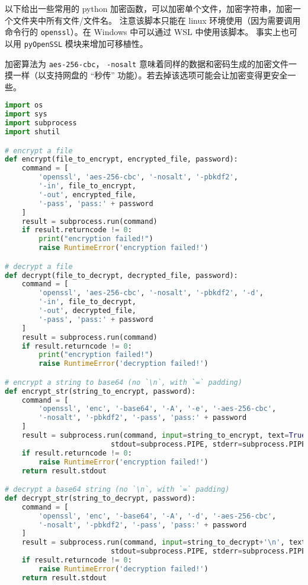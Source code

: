 

以下给出一些常用的 python 加密函数，可以加密单个文件，加密字符串，加密一个文件夹中所有文件/文件名。 注意该脚本只能在 linux 环境使用（因为需要调用命令行的 \verb`openssl`）。在 Windows 中可以通过 WSL 中使用该脚本。 事实上也可以用 \verb|pyOpenSSL| 模块来增加可移植性。

加密算法为 \verb`aes-256-cbc`， \verb`-nosalt` 意味着同样的数据和密码生成的加密文件一摸一样（以支持网盘的 “秒传” 功能）。若去掉该选项可能会让加密变得更安全一些。

\begin{lstlisting}[language=python,caption=encrypt.py]
import os
import sys
import subprocess
import shutil

# encrypt a file
def encrypt(file_to_encrypt, encrypted_file, password):
	command = [
		'openssl', 'aes-256-cbc', '-nosalt', '-pbkdf2',
		'-in', file_to_encrypt,
		'-out', encrypted_file,
		'-pass', 'pass:' + password
	]
	result = subprocess.run(command)
	if result.returncode != 0:
		print("encryption failed!")
		raise RuntimeError('encryption failed!')

# decrypt a file
def decrypt(file_to_decrypt, decrypted_file, password):
	command = [
		'openssl', 'aes-256-cbc', '-nosalt', '-pbkdf2', '-d',
		'-in', file_to_decrypt,
		'-out', decrypted_file,
		'-pass', 'pass:' + password
	]
	result = subprocess.run(command)
	if result.returncode != 0:
		print("encryption failed!")
		raise RuntimeError('decryption failed!')

# encrypt a string to base64 (no `\n`, with `=` padding)
def encrypt_str(string_to_encrypt, password):
	command = [
		'openssl', 'enc', '-base64', '-A', '-e', '-aes-256-cbc',
		'-nosalt', '-pbkdf2', '-pass', 'pass:' + password
	]
	result = subprocess.run(command, input=string_to_encrypt, text=True,
						 stdout=subprocess.PIPE, stderr=subprocess.PIPE)
	if result.returncode != 0:
		raise RuntimeError('encryption failed!')
	return result.stdout

# decrypt a base64 string (no `\n`, with `=` padding)
def decrypt_str(string_to_decrypt, password):
	command = [
		'openssl', 'enc', '-base64', '-A', '-d', '-aes-256-cbc',
		'-nosalt', '-pbkdf2', '-pass', 'pass:' + password
	]
	result = subprocess.run(command, input=string_to_decrypt+'\n', text=True,
						 stdout=subprocess.PIPE, stderr=subprocess.PIPE)
	if result.returncode != 0:
		raise RuntimeError('decryption failed!')
	return result.stdout


\end{lstlisting}
